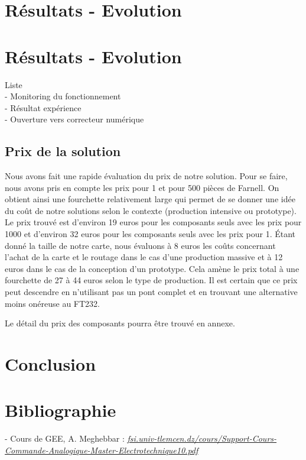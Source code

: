 \documentclass[11pt, french]{article} %
\begin{document}
\section{Résultats - Evolution}

\section{Résultats - Evolution}
Liste
\\- Monitoring du fonctionnement
\\- Résultat expérience
\\- Ouverture vers correcteur numérique

\subsection{Prix de la solution}

Nous avons fait une rapide évaluation du prix de notre solution. Pour se faire, nous avons pris en compte les prix pour 1 et pour 500 pièces de Farnell. On obtient ainsi une fourchette relativement large qui permet de se donner une idée du coût de notre solutions selon le contexte (production intensive ou prototype). Le prix trouvé est d'environ 19 euros pour les composants seuls avec les prix pour 1000 et d'environ 32 euros pour les composants seuls avec les prix pour 1. Étant donné la taille de notre carte, nous évaluons à 8 euros les coûts concernant l'achat de la carte et le routage dans le cas d'une production massive et à 12 euros dans le cas de la conception d'un prototype. Cela amène le prix total à une fourchette de 27 à 44 euros selon le type de production. Il est certain que ce prix peut descendre en n'utilisant pas un pont complet et en trouvant une alternative moins onéreuse au FT232. 

 
Le détail du prix des composants pourra être trouvé en annexe. 


\section{Conclusion}


\pagebreak
\section{Bibliographie}
\medskip
- Cours de GEE, A. Meghebbar :
\newline \textit{\underline{\url{fsi.univ-tlemcen.dz/cours/Support-Cours-Commande-Analogique-Master-Electrotechnique10.pdf}}} 
\end{document}
